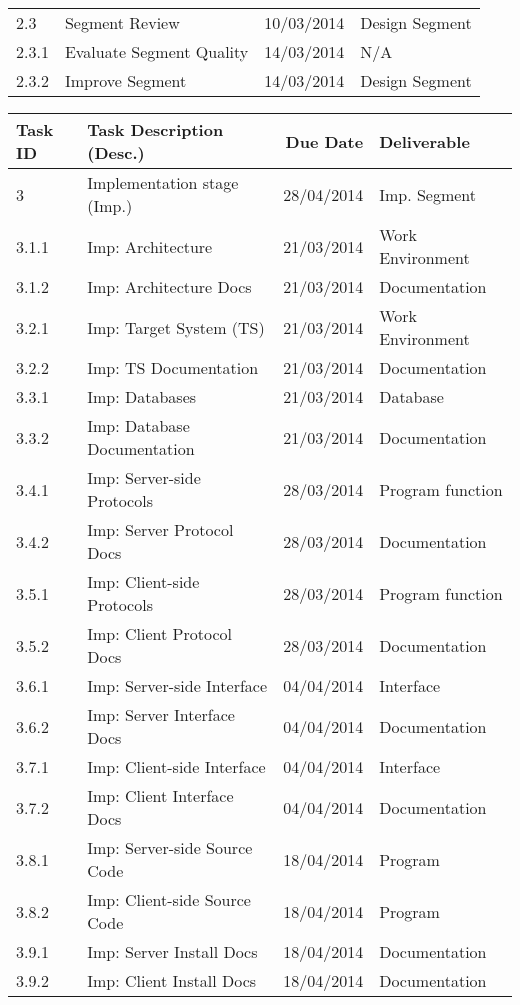 \begin{tabular}{llrl}
    2.3      & Segment Review               & 10/03/2014  & Design Segment    \\
    2.3.1    & Evaluate Segment Quality     & 14/03/2014  & N/A               \\
    2.3.2    & Improve Segment              & 14/03/2014  & Design Segment    \\
    
    \bottomrule
\end{tabular}


\begin{tabular}{llrl}
    
    \toprule
    
    Task ID  & Task Description (Desc.)     & Due Date    & Deliverable       \\
    
    \midrule
    
    3        & Implementation stage (Imp.)  & 28/04/2014  & Imp. Segment      \\
    3.1.1    & Imp: Architecture            & 21/03/2014  & Work Environment  \\
    3.1.2    & Imp: Architecture Docs       & 21/03/2014  & Documentation     \\
    3.2.1    & Imp: Target System  (TS)     & 21/03/2014  & Work Environment  \\
    3.2.2    & Imp: TS Documentation        & 21/03/2014  & Documentation     \\
    3.3.1    & Imp: Databases               & 21/03/2014  & Database          \\
    3.3.2    & Imp: Database Documentation  & 21/03/2014  & Documentation     \\
    3.4.1    & Imp: Server-side Protocols   & 28/03/2014  & Program function  \\
    3.4.2    & Imp: Server Protocol Docs    & 28/03/2014  & Documentation     \\
    3.5.1    & Imp: Client-side Protocols   & 28/03/2014  & Program function  \\
    3.5.2    & Imp: Client Protocol Docs    & 28/03/2014  & Documentation     \\
    3.6.1    & Imp: Server-side Interface   & 04/04/2014  & Interface         \\
    3.6.2    & Imp: Server Interface Docs   & 04/04/2014  & Documentation     \\
    3.7.1    & Imp: Client-side Interface   & 04/04/2014  & Interface         \\
    3.7.2    & Imp: Client Interface Docs   & 04/04/2014  & Documentation     \\
    3.8.1    & Imp: Server-side Source Code & 18/04/2014  & Program           \\
    3.8.2    & Imp: Client-side Source Code & 18/04/2014  & Program           \\
    3.9.1    & Imp: Server Install Docs     & 18/04/2014  & Documentation     \\
    3.9.2    & Imp: Client Install Docs     & 18/04/2014  & Documentation     \\
    \cmidrule(r){2-3}
    

\end{tabular}

